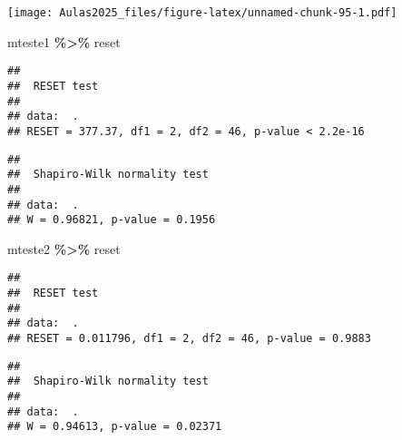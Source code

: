 \documentclass[
]{book}
\newenvironment{Shaded}{\begin{snugshade}}{\end{snugshade}}
\newcommand{\FunctionTok}[1]{\textcolor[rgb]{0.13,0.29,0.53}{\textbf{#1}}}
\newcommand{\NormalTok}[1]{#1}
\newcommand{\SpecialCharTok}[1]{\textcolor[rgb]{0.81,0.36,0.00}{\textbf{#1}}}
\begin{document}
\texttt{[image: Aulas2025\_files/figure-latex/unnamed-chunk-95-1.pdf]}

\begin{Shaded}
\begin{Highlighting}[]
\NormalTok{mteste1 }\SpecialCharTok{\%\textgreater{}\%}
\NormalTok{    reset}
\end{Highlighting}
\end{Shaded}

\begin{verbatim}
## 
##  RESET test
## 
## data:  .
## RESET = 377.37, df1 = 2, df2 = 46, p-value < 2.2e-16
\end{verbatim}

\begin{Shaded}
\end{Shaded}

\begin{verbatim}
## 
##  Shapiro-Wilk normality test
## 
## data:  .
## W = 0.96821, p-value = 0.1956
\end{verbatim}

\begin{Shaded}
\begin{Highlighting}[]
\NormalTok{mteste2 }\SpecialCharTok{\%\textgreater{}\%}
\NormalTok{    reset}
\end{Highlighting}
\end{Shaded}

\begin{verbatim}
## 
##  RESET test
## 
## data:  .
## RESET = 0.011796, df1 = 2, df2 = 46, p-value = 0.9883
\end{verbatim}

\begin{Shaded}
\end{Shaded}

\begin{verbatim}
## 
##  Shapiro-Wilk normality test
## 
## data:  .
## W = 0.94613, p-value = 0.02371
\end{verbatim}
\end{document}
